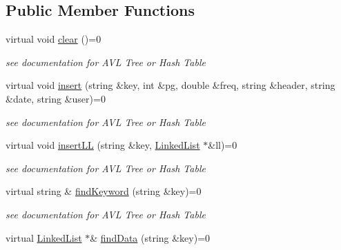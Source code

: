 \subsection*{Public Member Functions}
\begin{DoxyCompactItemize}
\item 
\hypertarget{class_index_a42835ba00eac72a146712468daaeba64}{virtual void \hyperlink{class_index_a42835ba00eac72a146712468daaeba64}{clear} ()=0}\label{class_index_a42835ba00eac72a146712468daaeba64}

\begin{DoxyCompactList}\small\item\em see documentation for A\-V\-L Tree or Hash Table \end{DoxyCompactList}\item 
\hypertarget{class_index_ad44792ad4f81ef1e17a0c6cb6f57167c}{virtual void \hyperlink{class_index_ad44792ad4f81ef1e17a0c6cb6f57167c}{insert} (string \&key, int \&pg, double \&freq, string \&header, string \&date, string \&user)=0}\label{class_index_ad44792ad4f81ef1e17a0c6cb6f57167c}

\begin{DoxyCompactList}\small\item\em see documentation for A\-V\-L Tree or Hash Table \end{DoxyCompactList}\item 
\hypertarget{class_index_a423c014174a0257d27b7e5c5834f92ed}{virtual void \hyperlink{class_index_a423c014174a0257d27b7e5c5834f92ed}{insert\-L\-L} (string \&key, \hyperlink{class_linked_list}{Linked\-List} $\ast$\&ll)=0}\label{class_index_a423c014174a0257d27b7e5c5834f92ed}

\begin{DoxyCompactList}\small\item\em see documentation for A\-V\-L Tree or Hash Table \end{DoxyCompactList}\item 
\hypertarget{class_index_a8ee654f84f96668a451afcf39fe2cc69}{virtual string \& \hyperlink{class_index_a8ee654f84f96668a451afcf39fe2cc69}{find\-Keyword} (string \&key)=0}\label{class_index_a8ee654f84f96668a451afcf39fe2cc69}

\begin{DoxyCompactList}\small\item\em see documentation for A\-V\-L Tree or Hash Table \end{DoxyCompactList}\item 
\hypertarget{class_index_a72c1cd00b6fce902a5d08e9278954913}{virtual \hyperlink{class_linked_list}{Linked\-List} $\ast$\& \hyperlink{class_index_a72c1cd00b6fce902a5d08e9278954913}{find\-Data} (string \&key)=0}\label{class_index_a72c1cd00b6fce902a5d08e9278954913}


\end{DoxyCompactItemize}
